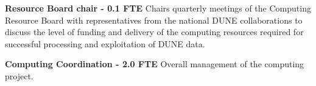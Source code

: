 \begin{description}
\item {\bf Resource Board chair - 0.1 FTE}
Chairs quarterly meetings of the Computing Resource Board with representatives from the national DUNE collaborations to discuss the level of funding and delivery of the computing resources required for successful processing and exploitation of DUNE data. %

\item {\bf Computing Coordination - 2.0 FTE}
Overall management of the computing project. %

\end{description}



